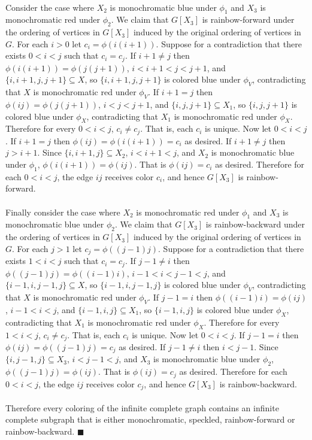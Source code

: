 \documentclass[letterpaper,12pt,oneside,onecolumn]{article}
\begin{document}
\paragraph{}
Consider the case where $X_2$ is monochromatic blue under $\phi_1$ and $X_3$ is monochromatic red under $\phi_2$. We claim that $G[X_3]$ is rainbow-forward under the ordering of vertices in $G[X_3]$ induced by the original ordering of vertices in $G$.  For each $i>0$ let $c_i = \phi(i(i+1))$. Suppose for a contradiction that there exists $0<i<j$ such that $c_i = c_j$. If $i+1 \neq j$ then $\phi(i(i+1)) = \phi(j(j+1))$, $i<i+1<j<j+1$, and $\{i,i+1,j,j+1\} \subseteq X$, so $\{i,i+1,j,j+1\}$ is colored blue under $\phi_V$, contradicting that $X$ is monochromatic red under $\phi_V$. If $i+1 = j$ then $\phi(ij) = \phi(j(j+1))$, $i<j<j+1$, and $\{i, j, j+1 \} \subseteq X_1$, so $\{i,j,j+1\}$ is colored blue under $\phi_X$, contradicting that $X_1$ is monochromatic red under $\phi_X$. Therefore for every $0<i<j$, $c_i \neq c_j$. That is, each $c_i$ is unique. Now let $0<i<j$. If $i+1=j$ then $\phi(ij) = \phi(i(i+1)) = c_i$ as desired. If $i+1 \neq j$ then $j > i+1$. Since $\{i,i+1,j\} \subseteq X_2$, $i<i+1<j$, and $X_2$ is monochromatic blue under $\phi_1$, $\phi(i(i+1)) = \phi(ij)$. That is $\phi(ij) = c_i$ as desired. Therefore for each $0<i<j$, the edge $ij$ receives color $c_i$, and hence $G[X_3]$ is rainbow-forward.
\paragraph{}
Finally consider the case where $X_2$ is monochromatic red under $\phi_1$ and $X_3$ is monochromatic blue under $\phi_2$. We claim that $G[X_3]$ is rainbow-backward under the ordering of vertices in $G[X_3]$ induced by the original ordering of vertices in $G$. For each $j>1$ let $c_j = \phi((j-1)j)$. Suppose for a contradiction that there exists $1<i<j$ such that $c_i = c_j$. If $j-1 \neq i$ then $\phi((j-1)j) = \phi((i-1)i)$, $i-1<i<j-1<j$, and $\{i-1,i,j-1,j\} \subseteq X$, so $\{i-1,i,j-1,j\}$ is colored blue under $\phi_V$, contradicting that $X$ is monochromatic red under $\phi_V$. If $j-1 = i$ then $\phi((i-1)i) = \phi(ij)$, $i-1<i<j$, and $\{i-1,i,j\} \subseteq X_1$, so $\{i-1,i,j\}$ is colored blue under $\phi_X$, contradicting that $X_1$ is monochromatic red under $\phi_X$. Therefore for every $1<i<j$, $c_i \neq c_j$. That is, each $c_i$ is unique. Now let $0<i<j$. If $j-1=i$ then $\phi(ij) = \phi((j-1)j) = c_j$ as desired. If $j-1 \neq i$ then $i<j-1$. Since $\{i,j-1,j\} \subseteq X_3$, $i<j-1<j$, and $X_3$ is monochromatic blue under $\phi_2$, $\phi((j-1)j) = \phi(ij)$. That is $\phi(ij) = c_j$ as desired. Therefore for each $0<i<j$, the edge $ij$ receives color $c_j$, and hence $G[X_3]$ is rainbow-backward.
\paragraph{}
Therefore every coloring of the infinite complete graph contains an infinite complete subgraph that is either monochromatic, speckled, rainbow-forward or rainbow-backward. $\blacksquare$
\end{document}
